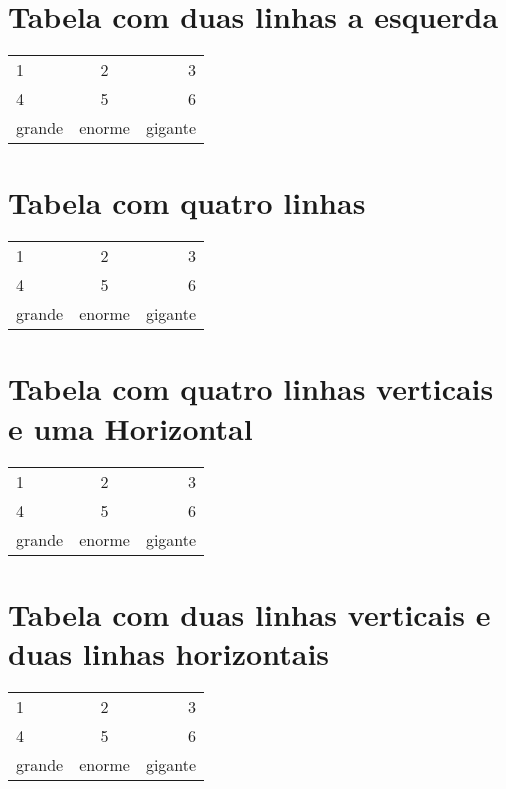 \documentclass[a4paper, 11pt]{report}
\begin{document}

\section{Tabela com duas linhas a esquerda}

\begin{table}[h!]
	\centering
	\begin{tabular}{ |l | c  r}
		1      & 2        & 3      \\
		4      & 5        & 6      \\
		grande & enorme   & gigante \\
	\end{tabular}
\end{table}

\section{Tabela com quatro linhas}
\begin{table}[h!]
	\centering
	\begin{tabular}{ | l | c|  r|}
		1      & 2        & 3      \\
		4      & 5        & 6      \\
		grande & enorme   & gigante \\
	\end{tabular}
\end{table}

\section{Tabela com quatro linhas verticais e uma Horizontal}

\begin{table}[h!]
	\centering
	\begin{tabular}{ | l | c|  r|}
		\hline
		1      & 2        & 3      \\
		4      & 5        & 6      \\
		grande & enorme   & gigante \\
	\end{tabular}
\end{table}

\section{Tabela com duas linhas verticais e duas linhas horizontais}

\begin{table}[h!]
	\centering
	\begin{tabular}{ | l | c|  r|}
		\hline
		1      & 2        & 3      \\
		4      & 5        & 6      \\
		\hline
		grande & enorme   & gigante \\
	\end{tabular}
\end{table}
\end{document}
